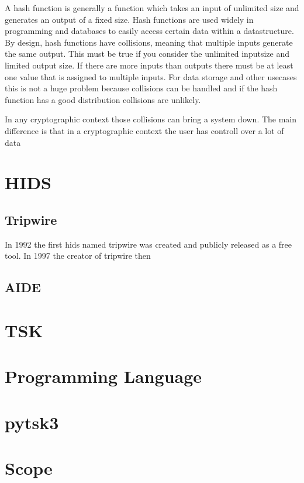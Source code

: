 \documentclass[
	a4paper,					%
	10pt,							%
	twoside,					%
	openright,				%
	notitlepage,			%
	parskip=half,			%
]{scrreprt}					%
\begin{document}
A hash function is generally a function which takes an input of unlimited size and generates an output of a fixed size. Hash functions are used widely in programming and databases to easily access certain data within a datastructure. By design, hash functions have collisions, meaning that multiple inputs generate the same output. This must be true if you consider the unlimited inputsize and limited output size. If there are more inputs than outputs there must be at least one value that is assigned to multiple inputs. For data storage and other usecases this is not a huge problem because collisions can be handled and if the hash function has a good distribution collisions are unlikely.

In any cryptographic context those collisions can bring a system down. The main difference is that in a cryptographic context the user has controll over a lot of data



\section{HIDS}

\subsection{Tripwire}

In 1992 the first \gls{hids} named tripwire was created and publicly released as a free tool. In 1997 the creator of tripwire then  \cite{Tripwire:Impl,Tripwire:company} 

\subsection{AIDE}



\section{TSK}

\section{Programming Language}

\section{pytsk3}

\section{Scope}
\end{document}
